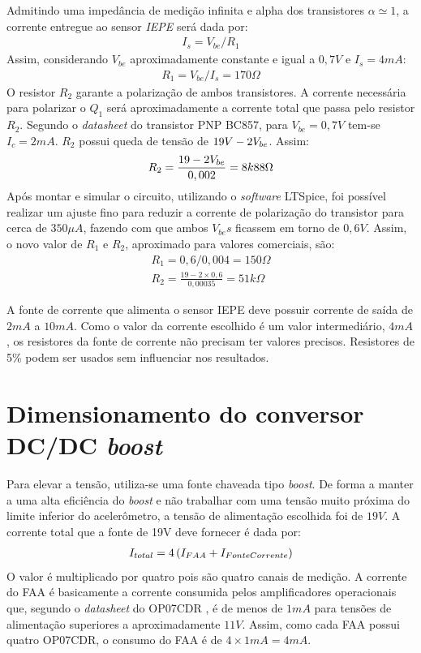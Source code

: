 \documentclass[
	12pt,				%
	openright,			%
	twoside,			%
	a4paper,			%
	english,			%
	french,				%
	spanish,			%
	brazil,				%
	]{abntex2}
\begin{document}
\begin{apendicesenv}
	Admitindo uma impedância de medição infinita e alpha dos transistores
	$\alpha\simeq1$, a corrente entregue ao sensor \textit{IEPE} será dada por:
	\begin{gather*}
		I_s = V_{be}/R_1
	\end{gather*}
	Assim, considerando $V_{be}$ aproximadamente constante e igual a $0,7V$ e
	$I_s = 4mA$:
	\begin{gather*}
		R_1 = V_{be}/I_s = 170\Omega
	\end{gather*}
	O resistor $R_2$ garante a polarização de ambos transistores. A
	corrente necessária para polarizar o $Q_1$ será aproximadamente a
	corrente total que passa pelo resistor $R_2$. Segundo o
	\textit{datasheet} do transistor PNP BC857, para $V_{be} = 0,7V$
	tem-se $I_c = 2mA$. $R_2$ possui queda de tensão de $19V -
	2\*V_{be}$. Assim:
	\begin{gather*}
		R_2 = \frac{19 - 2\*V_{be}}{0,002} = 8k88\Omega
	\end{gather*}
	Após montar e simular o circuito, utilizando o \textit{software}
	LTSpice, foi possível realizar um ajuste fino para reduzir a
	corrente de polarização do transistor para cerca de $350\mu A$,
	fazendo com que ambos $V_{be}s$ ficassem em torno de $0,6V$. Assim,
	o novo valor de $R_1$ e $R_2$, aproximado para valores comerciais,
	são:
	\begin{gather*}
		R_1 = 0,6/0,004 = 150\Omega\\
		R_2 = \frac{19-2\times 0,6}{0,00035} = 51k\Omega
	\end{gather*}

	A fonte de corrente que alimenta o sensor IEPE deve possuir
	corrente de saída de $2mA$ a $10mA$. Como o valor da corrente
	escolhido é um valor intermediário, $4mA$, os resistores da
	fonte de corrente não precisam ter valores precisos. Resistores
	de 5\% podem ser usados sem influenciar nos resultados.

\chapter{Dimensionamento do conversor DC/DC \textit{boost}}
\label{ape:calculoBoost}

	Para elevar a tensão, utiliza-se uma fonte chaveada tipo
	\textit{boost}. De forma a manter a uma alta eficiência do
	\textit{boost} e não trabalhar com uma tensão muito próxima do
	limite inferior do acelerômetro, a tensão de alimentação escolhida foi de $19V$.
	A corrente total que a fonte de 19V deve fornecer é dada por:
	\begin{gather*}
		I_{total} = 4\* \left(I_{FAA} + I_{FonteCorrente}\right)
	\end{gather*}
	O valor é multiplicado por quatro pois são quatro canais de medição. A corrente do FAA
	é basicamente a corrente consumida pelos amplificadores
	operacionais que, segundo o \textit{datasheet} do OP07CDR \cite{op07c}, é de
	menos de $1mA$ para tensões de alimentação superiores a
	aproximadamente $11V$. Assim, como cada FAA possui quatro OP07CDR,
	o consumo do FAA é de $4\times 1mA =  4mA$.


\end{apendicesenv}
\end{document}
